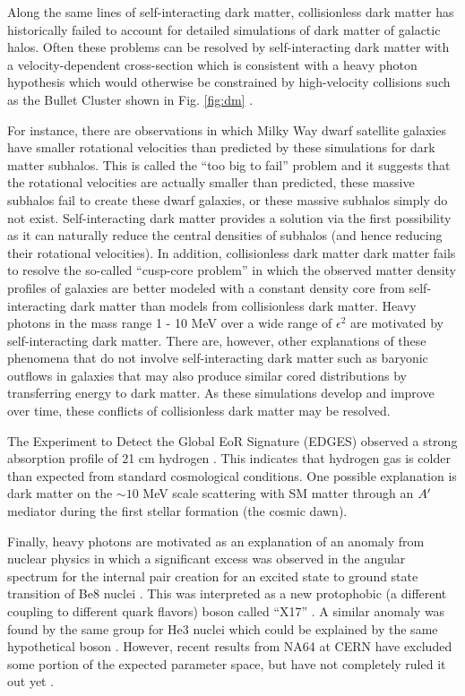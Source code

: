 Along the same lines of self-interacting dark matter, collisionless dark matter has historically failed to account for detailed simulations of dark matter of galactic halos. Often these problems can be resolved by self-interacting dark matter with a velocity-dependent cross-section which is consistent with a heavy photon hypothesis which would otherwise be constrained by high-velocity collisions such as the Bullet Cluster shown in Fig. \ref{fig:dm} \cite{Markevitch_2004}.

For instance, there are observations in which Milky Way dwarf satellite galaxies have smaller rotational velocities than predicted by these simulations for dark matter subhalos. This is called the ``too big to fail'' problem and it suggests that the rotational velocities are actually smaller than predicted, these massive subhalos fail to create these dwarf galaxies, or these massive subhalos simply do not exist. Self-interacting dark matter provides a solution via the first possibility as it can naturally reduce the central densities of subhalos (and hence reducing their rotational velocities). In addition, collisionless dark matter dark matter fails to resolve the so-called ``cusp-core problem'' in which the observed matter density profiles of galaxies are better modeled with a constant density core from self-interacting dark matter than models from collisionless dark matter. Heavy photons in the mass range 1 - 10 MeV over a wide range of $\epsilon^2$ are motivated by self-interacting dark matter. There are, however, other explanations of these phenomena that do not involve self-interacting dark matter such as baryonic outflows in galaxies that may also produce similar cored distributions by transferring energy to dark matter. As these simulations develop and improve over time, these conflicts of collisionless dark matter may be resolved.

The Experiment to Detect the Global EoR Signature (EDGES) observed a strong absorption profile of 21 cm hydrogen  \cite{FRASER2018159}. This indicates that hydrogen gas is colder than expected from standard cosmological conditions. One possible explanation is dark matter on the $\sim 10$ MeV scale scattering with SM matter through an $A^\prime$ mediator during the first stellar formation (the cosmic dawn).

Finally, heavy photons are motivated as an explanation of an anomaly from nuclear physics in which a significant excess was observed in the angular spectrum for the internal pair creation for an excited state to ground state transition of Be8 nuclei \cite{Krasznahorkay_2016}. This was interpreted as a new protophobic (a different coupling to different quark flavors) boson called ``X17''  \cite{Feng_2017}. A similar anomaly was found by the same group for He3 nuclei which could be explained by the same hypothetical boson \cite{krasznahorkay2019new}. However, recent results from NA64 at CERN have excluded some portion of the expected parameter space, but have not completely ruled it out yet \cite{Banerjee_2019}. %




